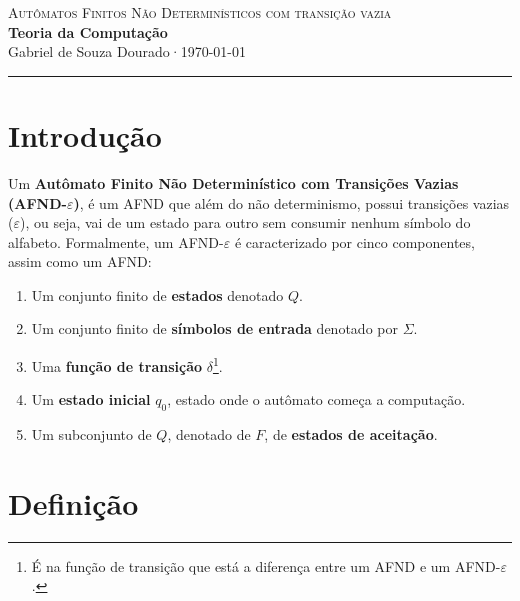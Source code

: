 \documentclass[12pt, a4paper]{article}
\theoremstyle{definition}
\theoremstyle{plain}
\theoremstyle{remark}
\newcommand{\docauthor}{Gabriel de Souza Dourado}
\newcommand{\doctitle}{Teoria da Computação}
\newcommand{\docsubtitle}{Autômatos Finitos Não Determinísticos com transição vazia}
\newcommand{\docdate}{\today}
\begin{document}
\begin{center}
  {\large \textcolor{mainblue}{\textsc{\docsubtitle}}}\\[0.4em]
  {\LARGE \textbf{\doctitle}}\\[0.6em]
  {\small \docauthor \quad·\quad \docdate}
  \vspace{0.4em}
  \hrule
\end{center}

\vspace{1em}


\section{Introdução}

Um \textbf{Autômato Finito Não Determinístico com Transições Vazias (AFND-$\varepsilon$)}, é um AFND que além do não determinismo, possui transições vazias ($\varepsilon$), ou seja, vai de um estado para outro sem consumir nenhum símbolo do alfabeto. Formalmente, um AFND-$\varepsilon$ é caracterizado por cinco componentes, assim como um AFND:

\begin{enumerate}
    \item Um conjunto finito de \textbf{estados} denotado $Q$.
    \item Um conjunto finito de \textbf{símbolos de entrada} denotado por $\Sigma$.
    \item Uma \textbf{função de transição} $\delta$\footnote{É na função de transição que está a diferença entre um AFND e um AFND-$\varepsilon$.}.
    \item Um \textbf{estado inicial} $q_0$, estado onde o autômato começa a computação.
    \item Um subconjunto de $Q$, denotado de $F$, de \textbf{estados de aceitação}.
\end{enumerate}

\section{Definição}
\end{document}
